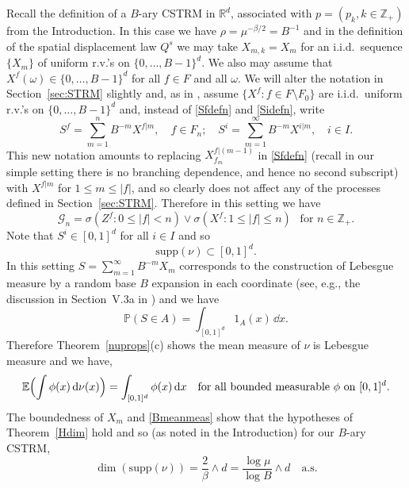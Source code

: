 \documentclass[12pt]{article}
\numberwithin{theorem}{section}
\theoremstyle{def}
\newtheorem*{definition}{Definition}
\numberwithin{equation}{section}
\renewcommand{\P}{\mathbb{P}}
\newcommand{\E}{\mathbb{E}}
\newcommand{\R}{\mathbb{R}}
\newcommand{\Z}{\mathbb{Z}}
\newcommand{\N}{\mathbb{N}}
\newcommand{\cG}{\mathcal G}
\newcommand{\cL}{\mathcal{L}}
\newcommand{\supp}{\mathrm{supp}}
\begin{document}

Recall the definition of a $B$-ary CSTRM in $\R^d$, associated with $p=(p_k,k\in\Z_+)$ from the Introduction.
In this case we have $\rho=\mu^{-\beta/2}=B^{-1}$ and in the definition of the spatial displacement law $Q^s$ we may take $X_{m,k}=X_m$ for an i.i.d.\ sequence $\{X_m\}$ of uniform r.v.'s on $\{0,\dots,B-1\}^d$. We also may assume that $X^f(\omega)\in\{0,\dots,B-1\}^d$ for all $f\in F$ and all $\omega$. We will alter the notation in Section~\ref{sec:STRM} slightly and, as in \cite{ADHP}, assume $\{X^f:f\in F\setminus F_0\}$ are i.i.d.\ uniform r.v.'s on $\{0,\dots,B-1\}^d$ and, instead of \eqref{Sfdefn} and \eqref{Sidefn}, write
\begin{equation}\label{BaryS}
S^f=\sum_{m=1}^n B^{-m}X^{f|m},\quad f\in F_n; \quad S^i=\sum_{m=1}^\infty B^{-m}X^{i|m},\quad i\in I.
\end{equation}
This new notation amounts to replacing $X^{f|(m-1)}_{f_m}$ in \eqref{Sfdefn} (recall in our simple setting there is no branching dependence, and hence no second subscript) with $X^{f|m}$ for $1\le m\le |f|$, and so clearly does not affect any of the processes defined in Section~\ref{sec:STRM}. Therefore in this setting we have 
\begin{equation}\label{newGdef}
\cG_n=\sigma(Z^f:0\le |f|<n)\vee\sigma(X^f:1\le |f|\le n)\ \ \text{ for }n\in\Z_+.
\end{equation}
Note that $S^i\in[0,1]^d$ for all $i\in I$ and so 
\[\supp(\nu)\subset [0,1]^d.\]
In this setting $S=\sum_{m=1}^\infty B^{-m}X_m$ corresponds to the construction of Lebesgue measure by a random base $B$ expansion in each coordinate (see, e.g., the discussion in Section~V.3a in \cite{Feller2}) and we have
\begin{equation}\label{Bmeanmeas}
\P(S\in A)=\int_{[0,1]^d}1_A(x)\, \dd x.
\end{equation}
Therefore Theorem~\ref{nuprops}(c) shows the mean measure of $\nu$ is Lebesgue measure and we have,
\begin{equation}\label{meanLeb} \E\Bigl(\int \phi(x) \,\dd \nu(x)\Bigr)=\int_{[0,1]^d}\phi(x)\,\dd x\quad\text{for all bounded measurable $\phi$ on $[0,1]^	d$}.
\end{equation}
The boundedness of $X_m$ and \eqref{Bmeanmeas} show that the hypotheses of Theorem~\ref{Hdim} hold and so (as noted in the Introduction) for our $B$-ary CSTRM,
\begin{equation*}
\dim(\supp(\nu))=\frac{2}{\beta}\wedge d=\frac{\log \mu}{\log B}\wedge d\quad \text{a.s.}
\end{equation*}
\end{document}
